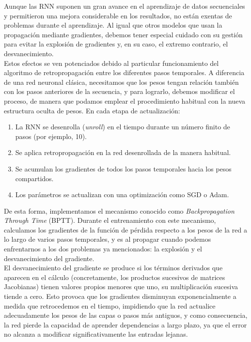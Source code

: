 Aunque las RNN suponen un gran avance en el aprendizaje de datos secuenciales y permitieron una mejora considerable en los resultados, no están exentas de problemas durante el aprendizaje. Al igual que otros modelos que usan la propagación mediante gradientes, debemos tener especial cuidado con su gestión para evitar la explosión de gradientes y, en su caso, el extremo contrario, el desvanecimiento.\\

Estos efectos se ven potenciados debido al particular funcionamiento del algoritmo de retropropagación entre los diferentes pasos temporales. A diferencia de una red neuronal clásica, necesitamos que los pesos tengan relación también con los pasos anteriores de la secuencia, y para lograrlo, debemos modificar el proceso, de manera que podamos emplear el procedimiento habitual con la nueva estructura oculta de pesos. En cada etapa de actualización:

\begin{enumerate}
	\item La RNN se desenrolla (\textit{unroll}) en el tiempo durante un número finito de pasos (por ejemplo, 10).
	
	\item Se aplica retropropagación en la red desenrollada de la manera habitual.
	
	\item Se acumulan los gradientes de todos los pasos temporales hacia los pesos compartidos.
	
	\item Los parámetros se actualizan con una optimización como SGD o Adam.
\end{enumerate}

De esta forma, implementamos el mecanismo conocido como \textit{Backpropagation Through Time} (BPTT). Durante el entrenamiento con este mecanismo, calculamos los gradientes de la función de pérdida respecto a los pesos de la red a lo largo de varios pasos temporales, y es al propagar cuando podemos enfrentarnos a los dos problemas ya mencionados: la explosión y el desvanecimiento del gradiente.\\

El desvanecimiento del gradiente se produce si los términos derivados que aparecen en el cálculo (concretamente, los productos sucesivos de matrices Jacobianas) tienen valores propios menores que uno, su multiplicación sucesiva tiende a cero. Esto provoca que los gradientes disminuyan exponencialmente a medida que retrocedemos en el tiempo, impidiendo que la red actualice adecuadamente los pesos de las capas o pasos más antiguos, y como consecuencia, la red pierde la capacidad de aprender dependencias a largo plazo, ya que el error no alcanza a modificar significativamente las entradas lejanas.\\
	
